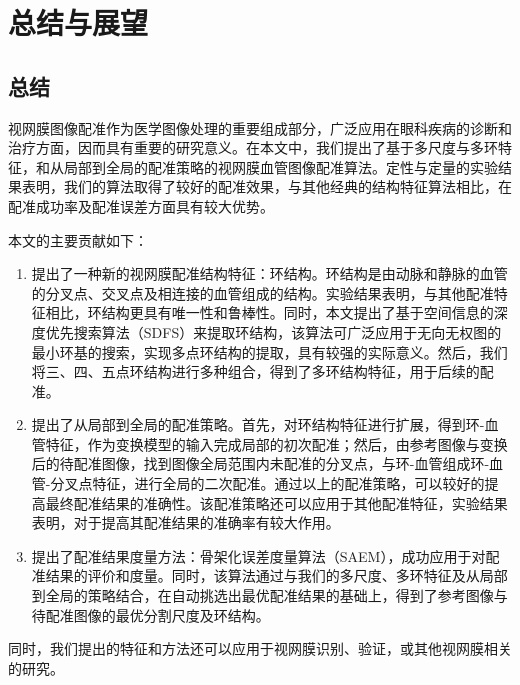 
\chapter{总结与展望}
\label{cha6}

\section{总结}
视网膜图像配准作为医学图像处理的重要组成部分，广泛应用在眼科疾病的诊断和治疗方面，因而具有重要的研究意义。在本文中，我们提出了基于多尺度与多环特征，和从局部到全局的配准策略的视网膜血管图像配准算法。定性与定量的实验结果表明，我们的算法取得了较好的配准效果，与其他经典的结构特征算法相比，在配准成功率及配准误差方面具有较大优势。

本文的主要贡献如下：
\begin{enumerate}
\item 提出了一种新的视网膜配准结构特征：环结构。环结构是由动脉和静脉的血管的分叉点、交叉点及相连接的血管组成的结构。实验结果表明，与其他配准特征相比，环结构更具有唯一性和鲁棒性。同时，本文提出了基于空间信息的深度优先搜索算法（SDFS）来提取环结构，该算法可广泛应用于无向无权图的最小环基的搜索，实现多点环结构的提取，具有较强的实际意义。然后，我们将三、四、五点环结构进行多种组合，得到了多环结构特征，用于后续的配准。
\item 提出了从局部到全局的配准策略。首先，对环结构特征进行扩展，得到环-血管特征，作为变换模型的输入完成局部的初次配准；然后，由参考图像与变换后的待配准图像，找到图像全局范围内未配准的分叉点，与环-血管组成环-血管-分叉点特征，进行全局的二次配准。通过以上的配准策略，可以较好的提高最终配准结果的准确性。该配准策略还可以应用于其他配准特征，实验结果表明，对于提高其配准结果的准确率有较大作用。
\item 提出了配准结果度量方法：骨架化误差度量算法（SAEM），成功应用于对配准结果的评价和度量。同时，该算法通过与我们的多尺度、多环特征及从局部到全局的策略结合，在自动挑选出最优配准结果的基础上，得到了参考图像与待配准图像的最优分割尺度及环结构。
\end{enumerate}
同时，我们提出的特征和方法还可以应用于视网膜识别、验证，或其他视网膜相关的研究。


